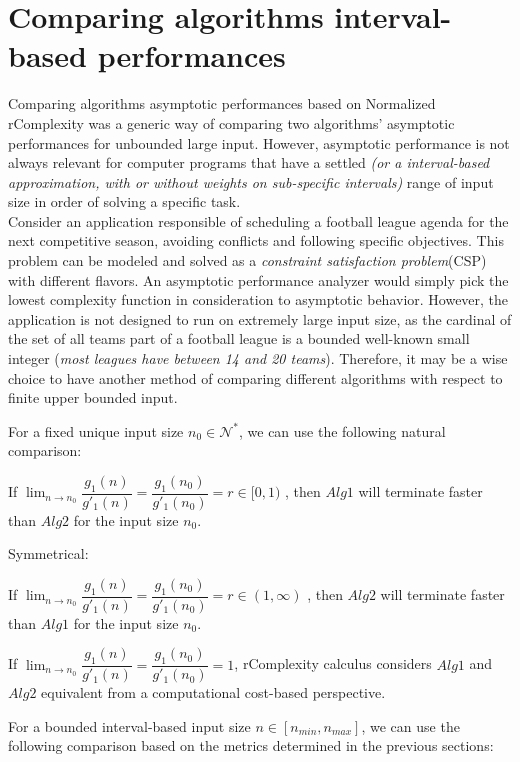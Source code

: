 \section{Comparing algorithms interval-based performances}
Comparing algorithms asymptotic performances based on Normalized rComplexity was a generic way of comparing two algorithms' asymptotic performances for unbounded large input. However, asymptotic performance is not always relevant for computer programs that have a settled \textit{(or a interval-based approximation, with or without weights on sub-specific intervals)} range of input size in order of solving a specific task.
\\ Consider an application responsible of scheduling a football league agenda for the next competitive season, avoiding conflicts and following specific objectives. This problem can be modeled and solved as a \textit{constraint satisfaction problem}(CSP) with different flavors. An asymptotic performance analyzer would simply pick the lowest complexity function in consideration to asymptotic behavior. However, the application is not designed to run on extremely large input size, as the cardinal of the set of all teams part of a football league is a bounded well-known small integer (\textit{most leagues have between 14 and 20 teams}). Therefore, it may be a wise choice to have another method of comparing different algorithms with respect to finite upper bounded input.

For a fixed unique input size $n_{0}\in \mathcal{N}^{*}$, we can use the following natural comparison:
\begin{lemma}
    If  $ \lim_{n\to n_{0}} \dfrac{g_{1}(n)}{g'_{1}(n)} = \dfrac{g_{1}(n_{0})}{g'_{1}(n_{0})} = r \in [0,1) $ , then $Alg1$ will terminate faster than $Alg2$ for the input size $n_{0}$.
\end{lemma}
Symmetrical:
\begin{lemma}
    If  $ \lim_{n\to n_{0}} \dfrac{g_{1}(n)}{g'_{1}(n)} = \dfrac{g_{1}(n_{0})}{g'_{1}(n_{0})} = r \in (1,\infty) $ , then $Alg2$ will terminate faster than $Alg1$ for the input size $n_{0}$.
\end{lemma}
\begin{remark}
    If  $ \lim_{n\to n_{0}} \dfrac{g_{1}(n)}{g'_{1}(n)} = \dfrac{g_{1}(n_{0})}{g'_{1}(n_{0})} = 1$, rComplexity calculus considers $Alg1$ and $Alg2$ equivalent from a computational cost-based perspective.
\end{remark}

For a bounded interval-based input size $n \in [n_{min}, n_{max}]$, we can use the following comparison based on the metrics determined in the previous sections:

